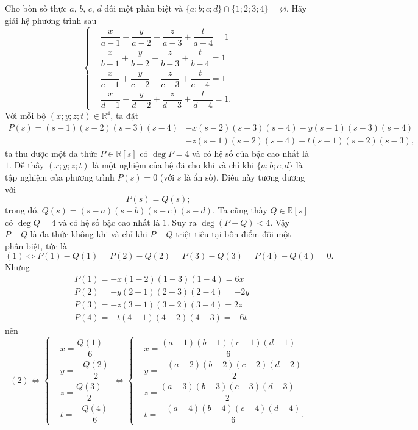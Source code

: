 \begin{bt}%
  Cho bốn số thực $a$, $b$, $c$, $d$ đôi một phân biệt và $\{a;b;c;d\}\cap\{1;2;3;4\}=\varnothing$. Hãy giải hệ phương trình sau
  $$\left\{\begin{aligned}
   &\dfrac{x}{a-1}+\dfrac{y}{a-2}+\dfrac{z}{a-3}+\dfrac{t}{a-4}=1\\
   &\dfrac{x}{b-1}+\dfrac{y}{b-2}+\dfrac{z}{b-3}+\dfrac{t}{b-4}=1\\
   &\dfrac{x}{c-1}+\dfrac{y}{c-2}+\dfrac{z}{c-3}+\dfrac{t}{c-4}=1\\
   &\dfrac{x}{d-1}+\dfrac{y}{d-2}+\dfrac{z}{d-3}+\dfrac{t}{d-4}=1.
  \end{aligned}\right.$$
 \loigiai
  {
  Với mỗi bộ $(x;y;z;t)\in\mathbb{R}^4$, ta đặt
  \begin{align*}
   P(s) =(s-1)(s-2)(s-3)(s-4) &-x(s-2)(s-3)(s-4)-y(s-1)(s-3)(s-4)\\
   &-z(s-1)(s-2)(s-4)-t(s-1)(s-2)(s-3),
  \end{align*}
  ta thu được một đa thức $P\in\mathbb{R}[s]$ có $\deg P=4$ và có hệ số của bậc cao nhất là $1$. Dễ thấy $(x;y;z;t)$ là một nghiệm của hệ đã cho khi và chỉ khi $\{a;b;c;d\}$ là tập nghiệm của phương trình $P(s)=0$ (với $s$ là ẩn số). Điều này tương đương với
  \begin{equation}
   P(s) = Q(s);\tag{$1$}
  \end{equation}
  trong đó, $Q(s) =(s-a)(s-b)(s-c)(s-d)$. Ta cũng thấy $Q\in\mathbb{R}[s]$ có $\deg Q=4$ và có hệ số bậc cao nhất là $1$. Suy ra $\deg (P-Q)<4$. Vậy $P-Q$ là đa thức không khi và chỉ khi $P-Q$ triệt tiêu tại bốn điểm đôi một phân biệt, tức là
  \begin{equation}
   (1) \Leftrightarrow P(1)-Q(1)=P(2)-Q(2)=P(3)-Q(3)=P(4)-Q(4)=0. \tag{$2$}
  \end{equation}
  Nhưng
  \allowdisplaybreaks
  \begin{align*}
   & P(1)=-x(1-2)(1-3)(1-4)=6x\\
   & P(2)=-y(2-1)(2-3)(2-4)=-2y\\
   & P(3)=-z(3-1)(3-2)(3-4)=2z\\
   & P(4)=-t(4-1)(4-2)(4-3)=-6t
  \end{align*}
  nên
$$(2) \Leftrightarrow  \left\{\begin{aligned}&x=\dfrac{Q(1)}{6} \\&y=-\dfrac{Q(2)}{2} \\&z=\dfrac{Q(3)}{2} \\&t=-\dfrac{Q(4)}{6}\end{aligned}\right.
   \Leftrightarrow \left\{\begin{aligned}&x=\dfrac{(a-1)(b-1)(c-1)(d-1)}{6}	\\&y=-\dfrac{(a-2)(b-2)(c-2)(d-2)}{2}	\\&z=\dfrac{(a-3)(b-3)(c-3)(d-3)}{2}	\\&t=-\dfrac{(a-4)(b-4)(c-4)(d-4)}{6}.\end{aligned}\right.
$$
  }
\end{bt}

